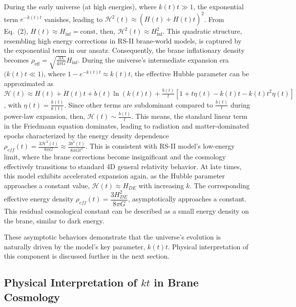 \documentclass[12pt]{article}  %
\begin{document}
During the early universe (at high energies), where $k(t) t\gg 1$, the exponential term $e^{-k(t) t}$ vanishes, leading to  $	{\mathcal H}^2(t) \approx \left( H(t) + \dot{H}(t) t  \right)^2 $.
From Eq.~(2), $H(t) \approx H_{\mathrm{inf}} = \mathrm{const}$, then, $	{\mathcal H}^2(t) \approx H_{\mathrm{inf}}^2$.  
This quadratic structure, resembling high energy corrections in RS-II brane-world models, is captured by the exponential term in our ansatz. Consequently, the brane inflationary density becomes $\rho_{\mathrm{eff}} = \sqrt{\frac{3 \lambda}{4 \pi G}} H_{\mathrm{inf}}$.  
During the universe's intermediate expansion era $\bigl(k(t) t \ll 1\bigr)$, where $1 - e^{-k(t) t} \approx k(t) t$, the effective Hubble parameter can be approximated as  $ {\mathcal H(t)} \approx H(t) + \dot{H}(t) t + \dot{b}(t) \ln(k(t)t) +\frac{b(t)}{t}\left[1+t\eta(t) - k(t)t-k(t)t^2 \eta(t) \right]$, 
with $\eta(t)=\frac{ \dot{k}(t)}{k(t)}$. Since other terms are subdominant compared to $\frac{b(t)}{t}$ during power-law expansion, then, ${\mathcal H}(t)\sim \frac{b(t)}{t}$. This means, the standard linear term in the Friedmann equation dominates, leading to radiation and matter-dominated epochs characterized by the energy density dependence $\rho_{eff}(t)=\frac{3{\mathcal H}^{2}(t)}{8\pi G}\approx \frac{3b^{2}(t)}{8\pi G t^2}$. This is consistent with RS-II model’s low-energy limit, where the brane corrections become insignificant and the cosmology effectively transitions to standard 4D general relativity behavior.
At late times, this model exhibits accelerated expansion again, as the Hubble parameter approaches a constant value, $\mathcal H(t)\approx H_{DE}$ with increasing $k$. The corresponding effective energy density $\rho_{eff}(t)=\dfrac{3H_{DE}^{2}}{8\pi G}$, asymptotically approaches a constant. This residual cosmological constant can be described as a small energy density on the brane, similar to dark energy.

These asymptotic behaviors demonstrate that the universe's evolution is naturally driven by the model's key parameter, $k(t)t$. Physical interpretation of this component is discussed further in the next section.



\subsection{Physical Interpretation of $kt$ in Brane Cosmology}
\end{document}
